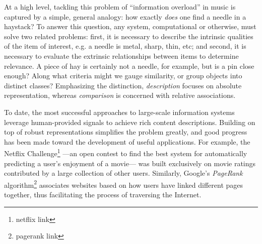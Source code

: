 At a high level, tackling this problem of ``information overload'' in music is captured by a simple, general analogy: how exactly \emph{does} one find a needle in a haystack?
To answer this question, any system, computational or otherwise, must solve two related problems:
first, it is necessary to describe the intrinsic qualities of the item of interest, e.g. a needle is metal, sharp, thin, etc;
and second, it is necessary to evaluate the extrinsic relationships between items to determine relevance.
A piece of hay is certainly not a needle, for example, but is a pin close enough?
Along what criteria might we gauge similarity, or group objects into distinct classes?
Emphasizing the distinction, \emph{description} focuses on absolute representation, whereas \emph{comparison} is concerned with relative associations.

To date, the most successful approaches to large-scale information systems leverage human-provided signals to achieve rich content descriptions.
Building on top of robust representations simplifies the problem greatly, and good progress has been made toward the development of useful applications.
For example, the Netflix Challenge\footnote{netflix link} ---an open contest to find the best system for automatically predicting a user's enjoyment of a movie--- was built exclusively on movie ratings contributed by a large collection of other users.
Similarly, Google's \emph{PageRank} algorithm\footnote{pagerank link} associates websites based on how users have linked different pages together, thus facilitating the process of traversing the Internet.

